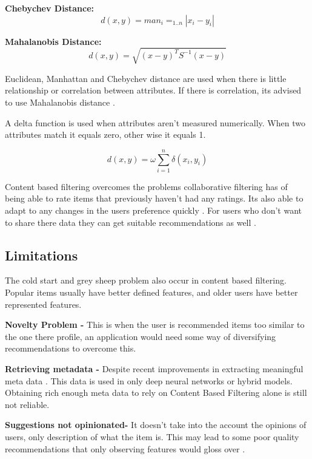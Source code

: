 \textbf{Chebychev Distance:}
\begin{equation}
	d(x,y) = man_{i} = _{1 . . n} | x_{i} - y_{i} |
\end{equation}

\textbf{Mahalanobis Distance:}
\begin{equation}
	d(x,y) = \sqrt{ ( x - y )^{ T } S^{ -1 } ( x - y ) }
\end{equation}

Euclidean, Manhattan and Chebychev distance are used when there is little relationship or correlation between attributes. If there is correlation, its advised to use Mahalanobis distance \citep{celma_recommendation_2010}.

A delta function is used when attributes aren't measured numerically. When two attributes match it equals zero, other wise it equals 1.

\begin{equation}
	d(x,y) = \omega \sum _{ i = 1 } ^{ n } \delta (x _{i}, y _{i})
\end{equation}

Content based filtering overcomes the problems collaborative filtering has of being able to rate items that previously haven't had any ratings. Its also able to adapt to any changes in the users preference quickly \citep{isinkaye_recommendation_2015}. For users who don't want to share there data they can get suitable recommendations as well \citep{k_you_2006}.

\subsection{Limitations}
The cold start and grey sheep problem also occur in content based filtering. Popular items usually have better defined features, and older users have better represented features.

\textbf{Novelty Problem - } This is when the user is recommended items too similar to the one there profile, an application would need some way of diversifying recommendations to overcome this.

\textbf{Retrieving metadata - } Despite recent improvements in extracting meaningful meta data \citep{vall_feature-combination_2019} \citep{singh_novel_2022}. This data is used in only deep neural networks or hybrid models. Obtaining rich enough meta data to rely on Content Based Filtering alone is still not reliable.

\textbf{Suggestions not opinionated- } It doesn't take into the account the opinions of users, only description of what the item is. This may lead to some poor quality recommendations that only observing features would gloss over \citep{celma_recommendation_2010}.  

